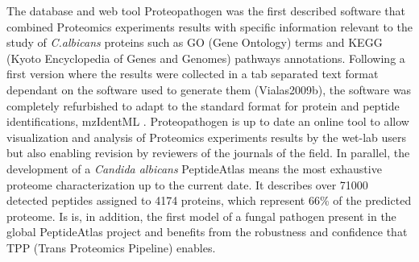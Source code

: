 The database and web tool Proteopathogen was the first described software 
that combined Proteomics experiments results with specific information 
relevant to the study of \textit{C.albicans} proteins such as GO (Gene Ontology)
terms and KEGG (Kyoto Encyclopedia of Genes and Genomes) pathways annotations.
Following a first version where the results were collected
in a tab separated text format dependant on the software used to generate 
them (Vialas2009b), the software was completely refurbished to adapt to
the standard format for protein and peptide identifications, mzIdentML 
\citep{Vialas2015}. Proteopathogen is up to date an online tool to allow
visualization and analysis of Proteomics experiments results by the wet-lab 
users but also enabling revision by reviewers of the journals of the field.
\newpage
In parallel, the development of a \textit{Candida albicans} PeptideAtlas
means the most exhaustive proteome characterization up to the current date.
It describes over 71000 detected peptides assigned to 4174 proteins, which
represent 66\% of the predicted proteome. Is is, in addition, the first 
model of a fungal pathogen present in the global PeptideAtlas project and
benefits from the robustness and confidence that TPP (Trans Proteomics Pipeline)
enables.

\endinput
